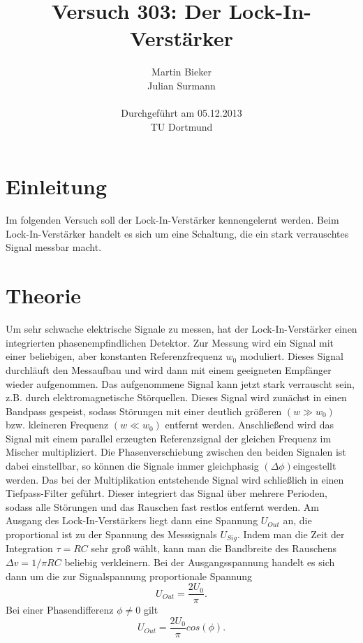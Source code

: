 \documentclass[11pt]{article}
\title{\textbf{Versuch 303: Der Lock-In-Verstärker}}
\author{Martin Bieker\\
		Julian Surmann\\
		\\
		Durchgef\"{u}hrt am 05.12.2013\\
		TU
		 Dortmund}
\date{}
\begin{document}
\renewcommand\tablename{Tabelle}
\renewcommand\figurename{Abbildung}
\maketitle
\thispagestyle{empty}
\newpage
\clearpage
\setcounter{page}{1}


\section{Einleitung}
Im folgenden Versuch soll der Lock-In-Verstärker kennengelernt werden. Beim Lock-In-Verstärker handelt es sich um eine Schaltung, die ein stark verrauschtes Signal messbar macht.
\section{Theorie}
Um sehr schwache elektrische Signale zu messen, hat der Lock-In-Verstärker einen integrierten phasenempfindlichen Detektor. Zur Messung wird ein Signal mit einer beliebigen, aber konstanten Referenzfrequenz $w_0$ moduliert. Dieses Signal durchläuft den Messaufbau und wird dann mit einem geeigneten Empfänger wieder aufgenommen. Das aufgenommene Signal kann jetzt stark verrauscht sein, z.B. durch elektromagnetische Störquellen. Dieses Signal wird zunächst in einen Bandpass gespeist, sodass Störungen mit einer deutlich größeren $(w \gg w_0)$ bzw. kleineren Frequenz $(w \ll w_0)$ entfernt werden. Anschließend wird das Signal mit einem parallel erzeugten Referenzsignal der gleichen Frequenz im Mischer multipliziert. Die Phasenverschiebung zwischen den beiden Signalen ist dabei einstellbar, so können die Signale immer gleichphasig $(\Delta \phi) $eingestellt werden. Das bei der Multiplikation entstehende Signal wird schließlich in einen Tiefpass-Filter geführt. Dieser integriert das Signal über mehrere Perioden, sodass alle Störungen und das Rauschen fast restlos entfernt werden. Am Ausgang des Lock-In-Verstärkers liegt dann eine Spannung $U_{Out}$ an, die proportional ist zu der Spannung des Messsignals $U_{Sig}$. Indem man die Zeit der Integration $\tau = RC$ sehr groß wählt, kann man die Bandbreite des Rauschens $\Delta v = 1 / \pi RC$ beliebig verkleinern.\newline
Bei der Ausgangsspannung handelt es sich dann um die zur Signalspannung proportionale Spannung
\begin{equation}
U_{Out} = \frac{2U_0}{\pi}.
\end{equation}
Bei einer Phasendifferenz $\phi \neq 0$ gilt
\begin{equation}
U_{Out} = \frac{2U_0}{\pi}cos(\phi).
\end{equation}
\end{document}
